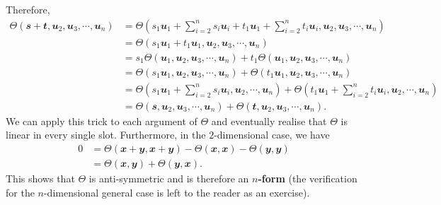 \documentclass[math, code]{amznotes}
\theoremstyle{remark}
\begin{document}
Therefore, 
\begin{align*}
    \Theta(\mathbfit{s} + \mathbfit{t}, \mathbfit{u}_2, \mathbfit{u}_3, \cdots, \mathbfit{u}_n) & = \Theta\left(s_1\mathbfit{u}_1 + \sum_{i = 2}^{n}s_i\mathbfit{u}_i + t_1\mathbfit{u}_1 + \sum_{i = 2}^{n}t_i\mathbfit{u}_i, \mathbfit{u}_2, \mathbfit{u}_3, \cdots, \mathbfit{u}_n\right) \\
    & = \Theta\left(s_1\mathbfit{u}_1 + t_1\mathbfit{u}_1, \mathbfit{u}_2, \mathbfit{u}_3, \cdots, \mathbfit{u}_n\right) \\
    & = s_1\Theta\left(\mathbfit{u}_1, \mathbfit{u}_2, \mathbfit{u}_3, \cdots, \mathbfit{u}_n\right) + t_1\Theta\left(\mathbfit{u}_1, \mathbfit{u}_2, \mathbfit{u}_3, \cdots, \mathbfit{u}_n\right) \\
    & = \Theta\left(s_1\mathbfit{u}_1, \mathbfit{u}_2, \mathbfit{u}_3, \cdots, \mathbfit{u}_n\right) + \Theta\left(t_1\mathbfit{u}_1, \mathbfit{u}_2, \mathbfit{u}_3, \cdots, \mathbfit{u}_n\right) \\
    & = \Theta\left(s_1\mathbfit{u}_1 + \sum_{i = 2}^{n}s_i\mathbfit{u}_i, \mathbfit{u}_2, \cdots, \mathbfit{u}_n\right) + \Theta\left(t_1\mathbfit{u}_1 + \sum_{i = 2}^{n}t_i\mathbfit{u}_i, \mathbfit{u}_2, \cdots, \mathbfit{u}_n\right) \\
    & =  \Theta\left(\mathbfit{s}, \mathbfit{u}_2, \mathbfit{u}_3, \cdots, \mathbfit{u}_n\right) +  \Theta\left(\mathbfit{t}, \mathbfit{u}_2, \mathbfit{u}_3, \cdots, \mathbfit{u}_n\right).
\end{align*}
We can apply this trick to each argument of $\Theta$ and eventually realise that $\Theta$ is linear in every single slot. Furthermore, in the $2$-dimensional case, we have 
\begin{align*}
    0 & = \Theta\left(\mathbfit{x} + \mathbfit{y}, \mathbfit{x} + \mathbfit{y}\right) - \Theta\left(\mathbfit{x}, \mathbfit{x}\right) - \Theta\left(\mathbfit{y}, \mathbfit{y}\right) \\
    & = \Theta\left(\mathbfit{x}, \mathbfit{y}\right) + \Theta\left(\mathbfit{y}, \mathbfit{x}\right).
\end{align*}
This shows that $\Theta$ is anti-symmetric and is therefore an \textbf{$n$-form} (the verification for the $n$-dimensional general case is left to the reader as an exercise).
\end{document}
